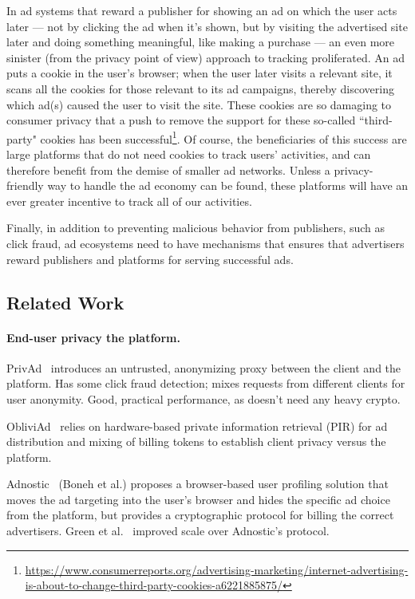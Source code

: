 In ad systems that reward a publisher for showing an ad on which the user acts later --- not by clicking the ad when it's shown, but by visiting the advertised site later and doing something meaningful, like making a purchase --- an even more sinister (from the privacy point of view) approach to tracking proliferated.  
%
An ad puts a cookie in the user's browser; when the user later visits a relevant site, it scans all the cookies for those relevant to its ad campaigns, thereby discovering which ad(s) caused the user to visit the site.
%
These cookies are so damaging to consumer privacy that a push to remove the support for these so-called ``third-party" cookies has been successful\footnote{\url{https://www.consumerreports.org/advertising-marketing/internet-advertising-is-about-to-change-third-party-cookies-a6221885875/}}.
%
Of course, the beneficiaries of this success are large platforms that do not need cookies to track users' activities, and can therefore benefit from the demise of smaller ad networks.
%
Unless a privacy-friendly way to handle the ad economy can be found, these platforms will have an ever greater incentive to track all of our activities.

Finally, in addition to preventing malicious behavior from publishers, such as click fraud, ad ecosystems need to have mechanisms that ensures that advertisers reward publishers and platforms for serving successful ads.  




\subsection{Related Work}
\label{s:bg-related}

\paragraph{End-user privacy \vs the platform.}
%
PrivAd~\cite{privad} introduces an untrusted, anonymizing proxy between the
client and the platform.
%
Has some click fraud detection; mixes requests from different clients for user
anonymity.
%
Good, practical performance, as doesn't need any heavy crypto.
%

%
ObliviAd~\cite{obliviad} relies on hardware-based private information retrieval
(PIR) for ad distribution and mixing of billing tokens to establish client
privacy versus the platform.
%

%
Adnostic~\cite{adnostic} (Boneh et al.) proposes a browser-based user profiling
solution that moves the ad targeting into the user's browser and hides the
specific ad choice from the platform, but provides a cryptographic protocol for
billing the correct advertisers.
%
Green et al.~\cite{adnostic+} improved scale over Adnostic's protocol.
%

